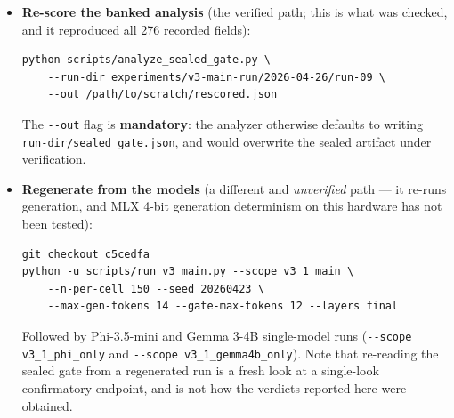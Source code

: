 \documentclass[10pt, letterpaper]{article}
\begin{document}
\begin{itemize}[leftmargin=*, itemsep=2pt, topsep=2pt]
  \texttt{requirements.txt} at the submission commit \emph{names} ten
  packages but pins no versions; the exact resolved environment was not
  captured, and this is a real limitation of the deposit rather than a
  formality.
  \item \textbf{Re-score the banked analysis} (the verified path; this
  is what was checked, and it reproduced all 276 recorded fields):
  \begin{verbatim}
python scripts/analyze_sealed_gate.py \
    --run-dir experiments/v3-main-run/2026-04-26/run-09 \
    --out /path/to/scratch/rescored.json
  \end{verbatim}
  The \texttt{-{}-out} flag is \textbf{mandatory}: the analyzer
  otherwise defaults to writing \texttt{run-dir/sealed\_gate.json}, and
  would overwrite the sealed artifact under verification.
  \item \textbf{Regenerate from the models} (a different and
  \emph{unverified} path --- it re-runs generation, and MLX 4-bit
  generation determinism on this hardware has not been tested):
  \begin{verbatim}
git checkout c5cedfa
python -u scripts/run_v3_main.py --scope v3_1_main \
    --n-per-cell 150 --seed 20260423 \
    --max-gen-tokens 14 --gate-max-tokens 12 --layers final
  \end{verbatim}
  Followed by Phi-3.5-mini and Gemma 3-4B single-model runs
  (\texttt{-{}-scope v3\_1\_phi\_only} and
  \texttt{-{}-scope v3\_1\_gemma4b\_only}). Note that re-reading the
  sealed gate from a regenerated run is a fresh look at a single-look
  confirmatory endpoint, and is not how the verdicts reported here were
  obtained.
\end{itemize}
\end{document}
